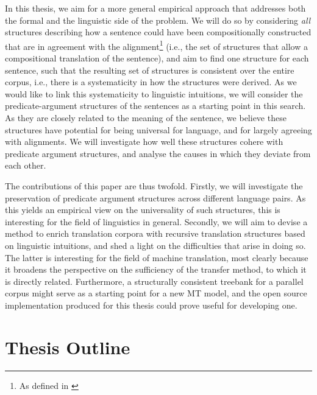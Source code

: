\documentclass[a4paper, 11pt]{report}
\theoremstyle{definition}
\theoremstyle{plain}
\begin{document}
In this thesis, we aim for a more general empirical approach that addresses both the formal and the linguistic side of the problem. We will do so by considering \textit{all} structures describing how a sentence could have been compositionally constructed that are in agreement with the alignment\footnote{As defined in \cite{simaan2013hats}}
(i.e., the set of structures that allow a compositional translation of the sentence), and aim to find one structure for each sentence, such that the resulting set of structures is consistent over the entire corpus, i.e., there is a systematicity in how the structures were derived. As we would like to link this systematicity to linguistic intuitions, we will consider the predicate-argument structures of the sentences as a starting point in this search. As they are closely related to the meaning of the sentence, we believe these structures have potential for being universal for language, and for largely agreeing with alignments. We will investigate how well these structures cohere with predicate argument structures, and analyse the causes in which they deviate from each other.

The contributions of this paper are thus twofold. Firstly, we will investigate the preservation of predicate argument structures across different language pairs. As this yields an empirical view on the universality of such structures, this is interesting for the field of linguistics in general. Secondly, we will aim to devise a method to enrich translation corpora with recursive translation structures based on linguistic intuitions, and shed a light on the difficulties that arise in doing so. The latter is interesting for the field of machine translation, most clearly because it broadens the perspective on the sufficiency of the transfer method, to which it is directly related. Furthermore, a structurally consistent treebank for a parallel corpus might serve as a starting point for a new MT model, and the open source implementation produced for this thesis could prove useful for developing one.


\section*{Thesis Outline}





\end{document}
